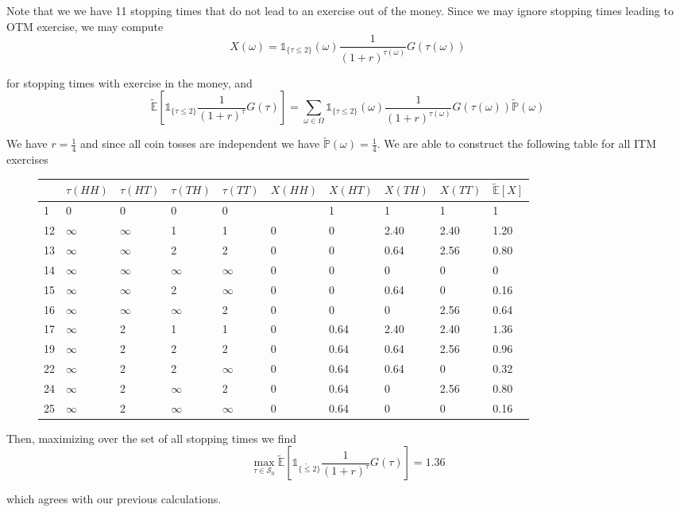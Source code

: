 \documentclass[12pt]{article}
\renewcommand{\P}{\mathbb P}
\newcommand{\E}{\mathbb E}
\begin{document}
Note that we we have 11 stopping times that do not lead to an exercise out of the money. Since we may ignore stopping times leading to OTM exercise, we may compute
\begin{equation*}
	X(\omega) = \mathds 1_{\{\tau \leq 2\}}(\omega) \frac{1}{(1 + r)^{\tau(\omega)}} G(\tau(\omega))
\end{equation*}

for stopping times with exercise in the money, and
\begin{equation*}
	\tilde{\E} \left[ \mathds 1_{\{\tau \leq 2\}} \frac{1}{(1 + r)^{\tau}} G(\tau) \right] = \sum_{\omega\in\Omega} \mathds 1_{\{\tau \leq 2\}}(\omega) \frac{1}{(1 + r)^{\tau(\omega)}} G(\tau(\omega)) \tilde{\P}(\omega)
\end{equation*}

We have $r = \frac{1}{4}$ and since all coin tosses are independent we have $\tilde{\P}(\omega) = \frac{1}{4}$. We are able to construct the following table for all ITM exercises
\begin{figure}[H]
\centering
\begin{tabular}{l|llllllll|l}
	& $\tau(HH)$ & $\tau(HT)$ & $\tau(TH)$ & $\tau(TT)$ & $X(HH)$ & $X(HT)$ & $X(TH)$ & $X(TT)$ & $\tilde{\E}[X]$ \\
	\hline
	1 & 0 & 0 & 0 & 0 & & 1 & 1 & 1 & 1 \\
	12 & $\infty$ & $\infty$ & 1 & 1 & 0 & 0 & 2.40 & 2.40 & 1.20 \\
	13 & $\infty$ & $\infty$ & 2 & 2 & 0 & 0 & 0.64 & 2.56 & 0.80 \\
	14 & $\infty$ & $\infty$ & $\infty$ & $\infty$ & 0 & 0 & 0 & 0 & 0 \\
	15 & $\infty$ & $\infty$ & 2 & $\infty$ & 0 & 0 & 0.64 & 0 & 0.16 \\
	16 & $\infty$ & $\infty$ & $\infty$ & 2 & 0 & 0 & 0 & 2.56 & 0.64 \\
	17 & $\infty$ & 2 & 1 & 1 & 0 & 0.64 & 2.40 & 2.40 & $\bm{1.36}$ \\
	19 & $\infty$ & 2 & 2 & 2 & 0 & 0.64 & 0.64 & 2.56 & 0.96 \\
	22 & $\infty$ & 2 & 2 & $\infty$ & 0 & 0.64 & 0.64 & 0 & 0.32 \\
	24 & $\infty$ & 2 & $\infty$ & 2 & 0 & 0.64 & 0 & 2.56 & 0.80 \\
	25 & $\infty$ & 2 & $\infty$ & $\infty$ & 0 & 0.64 & 0 & 0 & 0.16 \\
\end{tabular}
\end{figure}

Then, maximizing over the set of all stopping times we find
\begin{equation*}
	\max_{\tau \in \mathcal S_0} \tilde{\E} \left[ \mathds 1_{\{\tilde \leq 2\}} \frac{1}{(1 + r)^\tau} G(\tau) \right] = 1.36
\end{equation*}

which agrees with our previous calculations.
\end{document}
